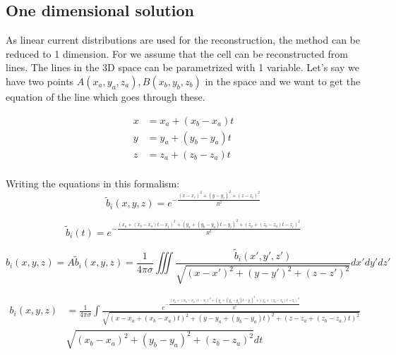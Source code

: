\documentclass[12pt,a4paper]{article}
\begin{document}
\subsection{ One dimensional solution }
As linear current distributions are used for the reconstruction, the method can be reduced to 1 dimension. For we assume that the cell can be reconstructed from lines.
The lines in the 3D space can be parametrized with 1 variable. Let's say we have two 
points $A (x_a,y_a,z_a), B (x_b,y_b,z_b)$ in the space and we want to get the equation of the line which goes through these. 

\begin{subequation}
\begin{align}
x &= x_a + (x_b - x_a) t \\
y &= y_a+(y_b-y_a)t \\
z &= z_a+(z_b-z_a)t \\
\end{align}
\end{subequation}


Writing the equations in this formalism:
\begin{equation}
\tilde{b}_i (x,y,z) = e^{- \frac{(x-x_i)^2+(y-y_i)^2+(z-z_i)^2}{R^2}}
\end{equation}

\begin{equation}
\tilde{b}_i (t) = e^{- \frac{(x_a + (x_b - x_a) t -x_i)^2+(y_a+(y_b-y_a)t-y_i)^2+( z_a+(z_b-z_a)t-z_i)^2}{R^2}}
\end{equation}



\begin{equation}
b_i (x,y,z)= A \tilde{b}_i (x,y,z)= \frac{1}{4 \pi \sigma} \iiint 
\frac{ \tilde{b}_i (x',y',z')}{\sqrt{(x-x')^2+(y-y')^2+(z-z')^2}} dx' dy' dz'
\end{equation}



\begin{equation}
\begin{align*}


b_i (x,y,z) &= 
\frac{1}{4 \pi \sigma} \int 
\frac{ e^{- \frac{(x_a + (x_b - x_a) t -x_i)^2+(y_a+(y_b-y_a)t-y_i)^2+( z_a+(z_b-z_a)t-z_i)^2}{R^2}}}{\sqrt{(x-x_a + (x_b - x_a) t)^2+(y- y_a+(y_b-y_a)t )^2+(z-z_a+(z_b-z_a)t)^2}} \\
&\sqrt{(x_b-x_a)^2 +(y_b-y_a)^2+(z_b-z_a)^2} dt
\end{align*}
\end{equation}
\end{document}
